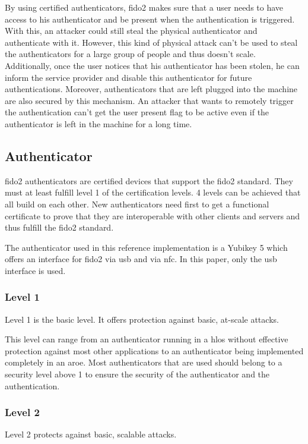 \documentclass[a4paper, 11pt]{scrartcl}
\begin{document}
By using certified authenticators, \gls{fido2} makes sure that a user needs to have access to his authenticator and be present when the authentication is triggered. With this, an attacker could still steal the physical authenticator and authenticate with it. However, this kind of physical attack can't be used to steal the authenticators for a large group of people and thus doesn't scale. Additionally, once the user notices that his authenticator has been stolen, he can inform the service provider and disable this authenticator for future authentications. Moreover, authenticators that are left plugged into the machine are also secured by this mechanism. An attacker that wants to remotely trigger the authentication can't get the user present flag to be active even if the authenticator is left in the machine for a long time. 

\subsection{Authenticator}
\gls{fido2} authenticators are certified devices that support the \gls{fido2} standard. They must at least fulfill level 1 of the certification levels. 4 levels can be achieved that all build on each other. New authenticators need first to get a functional certificate to prove that they are interoperable with other clients and servers and thus fulfill the \gls{fido2} standard.

The authenticator used in this reference implementation is a Yubikey 5 which offers an interface for \gls{fido2} via \gls{usb} and via \gls{nfc}. In this paper, only the \gls{usb} interface is used.

\subsubsection{Level 1}
Level 1 is the basic level. It offers protection against basic, at-scale attacks. \cite{fido:authenticator:level1}

This level can range from an authenticator running in a \gls{hlos} without effective protection against most other applications to an authenticator being implemented completely in an \gls{aroe}. Most authenticators that are used should belong to a security level above 1 to ensure the security of the authenticator and the authentication. \cite{fido:authenticator:level1}

\subsubsection{Level 2}
Level 2 protects against basic, scalable attacks. \cite{fido:authenticator:level2}
\end{document}
